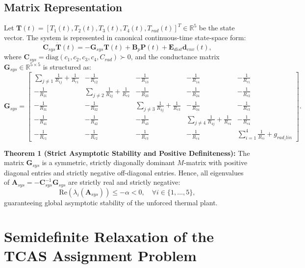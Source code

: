 \documentclass[11pt,a4paper]{article}
\begin{document}
\subsection{Matrix Representation}
Let $\mathbf{T}(t) = [T_1(t), T_2(t), T_3(t), T_4(t), T_{rad}(t)]^T \in \mathbb{R}^5$ be the state vector. The system is represented in canonical continuous-time state-space form:
\begin{equation}
\mathbf{C}_{sys} \dot{\mathbf{T}}(t) = -\mathbf{G}_{sys} \mathbf{T}(t) + \mathbf{B}_p \mathbf{P}(t) + \mathbf{E}_{dist} \mathbf{d}_{env}(t),
\end{equation}
where $\mathbf{C}_{sys} = \text{diag}(c_1, c_2, c_3, c_4, C_{rad}) \succ 0$, and the conductance matrix $\mathbf{G}_{sys} \in \mathbb{R}^{5\times 5}$ is structured as:
\begin{equation}
\mathbf{G}_{sys} = \begin{bmatrix}
\sum_{j\ne 1} \frac{1}{R_{1j}} + \frac{1}{R_{r1}} & -\frac{1}{R_{12}} & -\frac{1}{R_{13}} & -\frac{1}{R_{14}} & -\frac{1}{R_{r1}} \\
-\frac{1}{R_{21}} & \sum_{j\ne 2} \frac{1}{R_{2j}} + \frac{1}{R_{r2}} & -\frac{1}{R_{23}} & -\frac{1}{R_{24}} & -\frac{1}{R_{r2}} \\
-\frac{1}{R_{31}} & -\frac{1}{R_{32}} & \sum_{j\ne 3} \frac{1}{R_{3j}} + \frac{1}{R_{r3}} & -\frac{1}{R_{34}} & -\frac{1}{R_{r3}} \\
-\frac{1}{R_{41}} & -\frac{1}{R_{42}} & -\frac{1}{R_{43}} & \sum_{j\ne 4} \frac{1}{R_{4j}} + \frac{1}{R_{r4}} & -\frac{1}{R_{r4}} \\
-\frac{1}{R_{r1}} & -\frac{1}{R_{r2}} & -\frac{1}{R_{r3}} & -\frac{1}{R_{r4}} & \sum_{i=1}^4 \frac{1}{R_{ri}} + g_{rad\_lin}
\end{bmatrix}.
\end{equation}

\noindent\textbf{Theorem 1 (Strict Asymptotic Stability and Positive Definiteness):} The matrix $\mathbf{G}_{sys}$ is a symmetric, strictly diagonally dominant $M$-matrix with positive diagonal entries and strictly negative off-diagonal entries. Hence, all eigenvalues of $\mathbf{A}_{sys} = -\mathbf{C}_{sys}^{-1} \mathbf{G}_{sys}$ are strictly real and strictly negative:
\begin{equation}
\text{Re}(\lambda_i(\mathbf{A}_{sys})) \le -\alpha < 0, \quad \forall i \in \{1, \dots, 5\},
\end{equation}
guaranteeing global asymptotic stability of the unforced thermal plant.

\section{Semidefinite Relaxation of the TCAS Assignment Problem}
\end{document}
